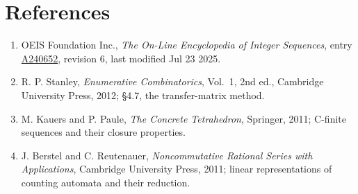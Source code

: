 \documentclass[11pt]{article}
\theoremstyle{definition}
\begin{document}
\section{References}

\begin{enumerate}

\item OEIS Foundation Inc., \emph{The On-Line Encyclopedia of Integer Sequences}, entry \href{https://oeis.org/A240652}{A240652}, revision 6, last modified Jul 23 2025.

\item R. P. Stanley, \emph{Enumerative Combinatorics}, Vol.~1, 2nd ed., Cambridge University Press, 2012; \S4.7, the transfer-matrix method.

\item M. Kauers and P. Paule, \emph{The Concrete Tetrahedron}, Springer, 2011; C-finite sequences and their closure properties.

\item J. Berstel and C. Reutenauer, \emph{Noncommutative Rational Series with Applications}, Cambridge University Press, 2011; linear representations of counting automata and their reduction.

\end{enumerate}
\end{document}
